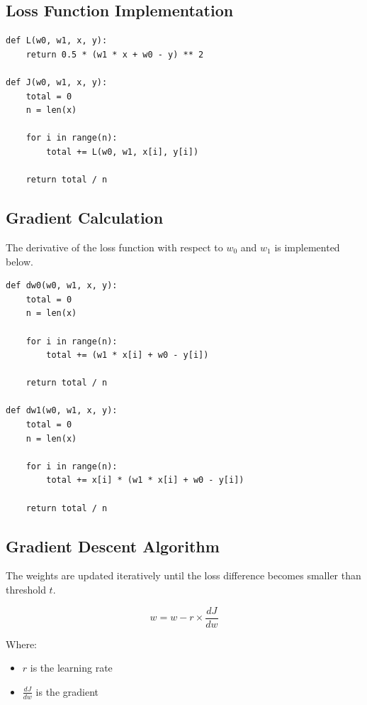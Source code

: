 \documentclass{article}
\begin{document}
\subsection{Loss Function Implementation}

\begin{lstlisting}
def L(w0, w1, x, y):
    return 0.5 * (w1 * x + w0 - y) ** 2

def J(w0, w1, x, y):
    total = 0
    n = len(x)

    for i in range(n):
        total += L(w0, w1, x[i], y[i])

    return total / n
\end{lstlisting}

\subsection{Gradient Calculation}

The derivative of the loss function with respect to $w_0$ and $w_1$ is implemented below.

\begin{lstlisting}
def dw0(w0, w1, x, y):
    total = 0
    n = len(x)

    for i in range(n):
        total += (w1 * x[i] + w0 - y[i])

    return total / n

def dw1(w0, w1, x, y):
    total = 0
    n = len(x)

    for i in range(n):
        total += x[i] * (w1 * x[i] + w0 - y[i])

    return total / n
\end{lstlisting}

\subsection{Gradient Descent Algorithm}

The weights are updated iteratively until the loss difference becomes smaller than threshold $t$.

\[
w = w - r \times \frac{dJ}{dw}
\]

Where:

\begin{itemize}
    \item $r$ is the learning rate
    \item $\frac{dJ}{dw}$ is the gradient
\end{itemize}
\end{document}
